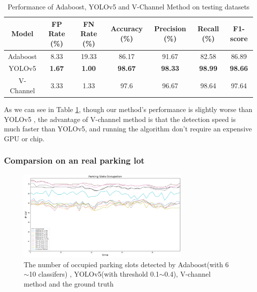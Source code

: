 \documentclass{article}[12pt, twocolumn]
\begin{document}
\begin{table}[H]
    \centering
    \caption{Performance of Adaboost, YOLOv5 and V-Channel Method on testing datasets}
    \begin{tabular}{@{}ccccccc@{}}
    \toprule
    Model    & FP Rate (\%)  & FN Rate (\%)  & Accuracy (\%)  & Precision (\%) & Recall (\%)    & F1-score       \\ \midrule
    Adaboost & 8.33          & 19.33         & 86.17          & 91.67          & 82.58          & 86.89          \\
    YOLOv5   & \textbf{1.67} & \textbf{1.00} & \textbf{98.67} & \textbf{98.33} & \textbf{98.99} & \textbf{98.66} \\ 
    V-Channel & 3.33 & 1.33 & 97.6 & 96.67 & 98.64 & 97.64 \\ \bottomrule
    \end{tabular}
    \label{tab:com_v}
\end{table}

As we can see in Table \ref{tab:com_v}, though our method's performance is slightly worse than YOLOv5
, the advantage of V-channel method is that the detection speed is much faster than YOLOv5, 
and running the algorithm don't require an expensive GPU or chip. 

\subsubsection{Comparsion on an real parking lot}

\begin{figure}[H]
    \centering
    \includegraphics[width=0.75\textwidth]{figure/Parking_Slots_Occupation_v.png}
    \caption{The number of occupied parking slots detected by Adaboost(with 6$\sim$10 classifers)
    , YOLOv5(with threshold 0.1$\sim$0.4), V-channel method and the ground truth}
\end{figure}
\end{document}
